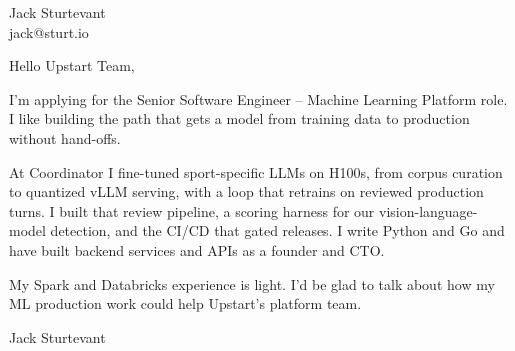 \documentclass[11pt]{article}
\begin{document}
\raggedright

{\namefont\fontsize{20pt}{24pt}\selectfont Jack Sturtevant}\\[-0.3em]
jack@sturt.io

\vspace{1.2em}

Hello Upstart Team,

I'm applying for the Senior Software Engineer -- Machine Learning Platform role. I like building the path that gets a model from training data to production without hand-offs.

At Coordinator I fine-tuned sport-specific LLMs on H100s, from corpus curation to quantized vLLM serving, with a loop that retrains on reviewed production turns. I built that review pipeline, a scoring harness for our vision-language-model detection, and the CI/CD that gated releases. I write Python and Go and have built backend services and APIs as a founder and CTO.

My Spark and Databricks experience is light. I'd be glad to talk about how my ML production work could help Upstart's platform team.

\vspace{0.6em}
Jack Sturtevant
\end{document}
